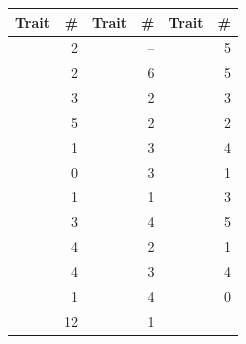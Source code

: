 \begin{tabular}{@{}lr@{\hspace{1em}}lr@{\hspace{1em}}lr@{}}
\toprule
Trait & \# & Trait & \# & Trait & \# \\
\midrule
\ct{TAssignment} & 2 & \ct{TEntityCreator} & -- & \ct{TStatement} & 5 \\
\ct{TBehaviouralEntity} & 2 & \ct{TExpression} & 6 & \ct{TStatementBlock} & 5 \\
\ct{TBinaryExpression} & 3 & \ct{TExpressionStatement} & 2 & \ct{TStringLiteral} & 3 \\
\ct{TBooleanLiteral} & 5 & \ct{TInvocation} & 2 & \ct{TUnaryExpression} & 2 \\
\ct{TBreakStatement} & 1 & \ct{TLiteral} & 3 & \ct{TVariableEntity} & 4 \\
\ct{TCanBeLocalDeclaration} & 0 & \ct{TLoopStatement} & 3 & \ct{TVariableExpression} & 1 \\
\ct{TCanBeVariable} & 1 & \ct{TNamedBehaviouralEntity} & 1 & \ct{TWithArguments} & 3 \\
\ct{TCharacterLiteral} & 3 & \ct{TNamedEntity} & 4 & \ct{TWithComments} & 5 \\
\ct{TComment} & 4 & \ct{TNullPointerLiteral} & 2 & \ct{TWithCondition} & 1 \\
\ct{TConditionalStatement} & 4 & \ct{TNumericalLiteral} & 3 & \ct{TWithParameters} & 4 \\
\ct{TContinueStatement} & 1 & \ct{TReturnStatement} & 4 & \ct{TWithStatements} & 0 \\
\ct{TEntity} & 12 & \ct{TScopableEntity} & 1 &  &  \\
\bottomrule
\end{tabular}
